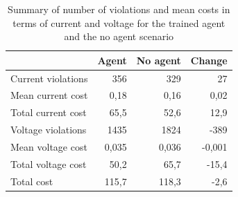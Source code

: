 \documentclass[class=book, crop=false]{standalone}
\begin{document}
\begin{table}[ht]
\center
\begin{tabular}{l|rrr}
                   & Agent & No agent & Change \\
\hline
Current violations & 356   & 329      & 27     \\
Mean current cost  & 0,18  & 0,16     & 0,02  \\
Total current cost & 65,5  & 52,6     & 12,9   \\
Voltage violations & 1435  & 1824     & -389   \\
Mean voltage cost  & 0,035 & 0,036    & -0,001 \\
Total voltage cost & 50,2  & 65,7     & -15,4  \\
Total cost         & 115,7 & 118,3    & -2,6  \\
\hline
\end{tabular}
\caption{Summary of number of violations and mean costs in terms of current and voltage for the trained agent and the no agent scenario}
\label{table:results:config1_summary}
\end{table}
\end{document}
